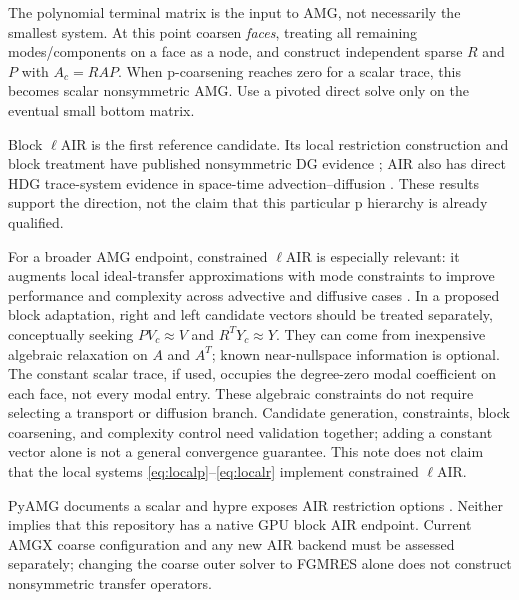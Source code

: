 \documentclass[11pt]{article}
\numberwithin{equation}{section}
\numberwithin{figure}{section}
\numberwithin{table}{section}
\newcommand{\code}[1]{\texttt{\detokenize{#1}}}
\begin{document}
The polynomial terminal matrix is the input to AMG, not necessarily the
smallest system. At this point coarsen \emph{faces}, treating all remaining
modes/components on a face as a node, and construct independent sparse
$R$ and $P$ with $A_c=RAP$. When p-coarsening reaches zero for a scalar
trace, this becomes scalar nonsymmetric AMG. Use a pivoted direct solve
only on the eventual small bottom matrix.

Block $\ell$AIR is the first reference candidate. Its local restriction
construction and block treatment have published nonsymmetric DG evidence
\cite{lair}; AIR also has direct HDG trace-system evidence in space-time
advection--diffusion \cite{hdgair}. These results support the direction,
not the claim that this particular p hierarchy is already qualified.

For a broader AMG endpoint, constrained $\ell$AIR is especially relevant:
it augments local ideal-transfer approximations with mode constraints to
improve performance and complexity across advective and diffusive cases
\cite{clair}. In a proposed block adaptation, right and left candidate
vectors should be treated separately, conceptually seeking
$PV_c\approx V$ and $R^TY_c\approx Y$. They can come from inexpensive
algebraic relaxation on $A$ and $A^T$; known near-nullspace information is
optional. The constant scalar trace, if used, occupies the degree-zero
modal coefficient on each face, not every modal entry. These algebraic
constraints do not require selecting a transport or diffusion branch.
Candidate generation, constraints, block coarsening, and complexity control
need validation together; adding a constant vector alone is not a general
convergence guarantee. This note does not claim that the local systems
\eqref{eq:localp}--\eqref{eq:localr} implement constrained $\ell$AIR.

PyAMG documents a scalar \code{air_solver} and hypre exposes AIR restriction
options \cite{pyamg,hypre}. Neither implies that this repository has a
native GPU block AIR endpoint. Current AMGX coarse configuration and any
new AIR backend must be assessed separately; changing the coarse outer
solver to FGMRES alone does not construct nonsymmetric transfer operators.
\end{document}
